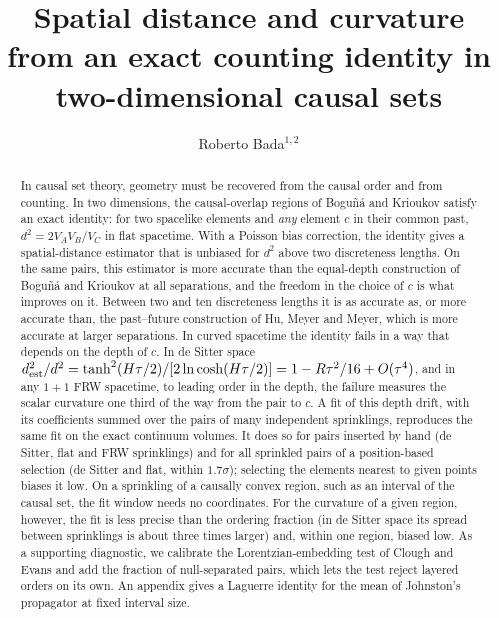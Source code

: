 \documentclass[12pt]{iopart}
\begin{document}
\title[Spatial distance and curvature from a counting identity]{Spatial distance and curvature from an exact counting identity in two-dimensional causal sets}

\author{Roberto Bada$^{1,2}$}

\address{$^1$ SapereIA, Barcelona, Spain}
\address{$^2$ Institute of Cosmos Sciences, University of Barcelona (ICCUB), Barcelona, Spain}

\begin{abstract}
In causal set theory, geometry must be recovered from the causal order and from counting. In two dimensions, the causal-overlap regions of Bogu\~n\'a and Krioukov satisfy an exact identity: for two spacelike elements and \emph{any} element $c$ in their common past, $d^2=2V_AV_B/V_C$ in flat spacetime. With a Poisson bias correction, the identity gives a spatial-distance estimator that is unbiased for $d^2$ above two discreteness lengths. On the same pairs, this estimator is more accurate than the equal-depth construction of Bogu\~n\'a and Krioukov at all separations, and the freedom in the choice of $c$ is what improves on it. Between two and ten discreteness lengths it is as accurate as, or more accurate than, the past--future construction of Hu, Meyer and Meyer, which is more accurate at larger separations. In curved spacetime the identity fails in a way that depends on the depth of $c$. In de Sitter space $d^2_{\rm est}/d^2=\tanh^2(H\tau/2)/[2\ln\cosh(H\tau/2)]=1-R\tau^2/16+O(\tau^4)$, and in any $1+1$ FRW spacetime, to leading order in the depth, the failure measures the scalar curvature one third of the way from the pair to $c$. A fit of this depth drift, with its coefficients summed over the pairs of many independent sprinklings, reproduces the same fit on the exact continuum volumes. It does so for pairs inserted by hand (de Sitter, flat and FRW sprinklings) and for all sprinkled pairs of a position-based selection (de Sitter and flat, within $1.7\sigma$); selecting the elements nearest to given points biases it low. On a sprinkling of a causally convex region, such as an interval of the causal set, the fit window needs no coordinates. For the curvature of a given region, however, the fit is less precise than the ordering fraction (in de Sitter space its spread between sprinklings is about three times larger) and, within one region, biased low. As a supporting diagnostic, we calibrate the Lorentzian-embedding test of Clough and Evans and add the fraction of null-separated pairs, which lets the test reject layered orders on its own. An appendix gives a Laguerre identity for the mean of Johnston's propagator at fixed interval size.
\end{abstract}
\end{document}
